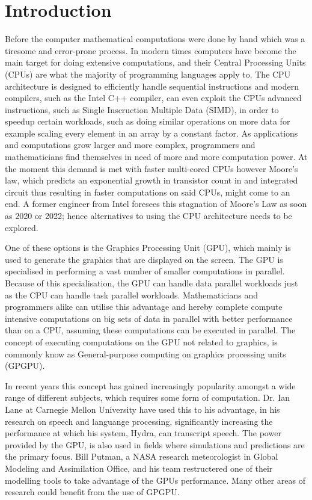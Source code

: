 \chapter{Introduction} %
\label{cha:introduction}
Before the computer mathematical computations were done by hand which was a tiresome and error-prone process.
In modern times computers have become the main target for doing extensive computations, and their Central Processing Units (CPUs) are what the majority of programming languages apply to.
The CPU architecture is designed to efficiently handle sequential instructions and modern compilers, such as the Intel C++ compiler, can even exploit the CPUs advanced instructions, such as Single Inscruction Multiple Data (SIMD), in order to speedup certain workloads, such as doing similar operations on more data for example scaling every element in an array by a constant factor. \citep{INTEL_SIMD}
As applications and computations grow larger and more complex, programmers and mathematicians find themselves in need of more and more computation power. \citep[pp. 4]{OpenCL_AMD}
At the moment this demand is met with faster multi-cored CPUs however Moore's law, which predicts an exponential growth in transistor count in and integrated circuit thus resulting in faster computations on said CPUs, might come to an end.
A former engineer from Intel foresees this stagnation of Moore's Law as soon as 2020 or 2022; hence alternatives to using the CPU architecture needs to be explored. \citep{Moore2013}

One of these options is the Graphics Processing Unit (GPU), which mainly is used to generate the graphics that are displayed on the screen.
The GPU is specialised in performing a vast number of smaller computations in parallel.
Because of this specialisation, the GPU can handle data parallel workloads just as the CPU can handle task parallel workloads.
Mathematicians and programmers alike can utilise this advantage and hereby complete compute intensive computations on big sets of data in parallel with better performance than on a CPU, assuming these computations can be executed in parallel.
The concept of executing computations on the GPU not related to graphics, is commonly know as General-purpose computing on graphics processing units (GPGPU).

In recent years this concept has gained increasingly popularity amongst a wide range of different subjects, which requires some form of computation.
Dr. Ian Lane at Carnegie Mellon University have used this to his advantage, in his research on speech and languange processing, significantly increasing the performance at which his system, Hydra, can transcript speech. \citep{NvidiaSpotlightIan}
The power provided by the GPU, is also used in fields where simulations and predictions are the primary focus. 
Bill Putman, a NASA research meteorologist in Global Modeling and Assimilation Office, and his team restructered one of their modelling tools to take advantage of the GPUs performance. \citep{NvidiaSpotlightNasa}
Many other areas of research could benefit from the use of GPGPU.

